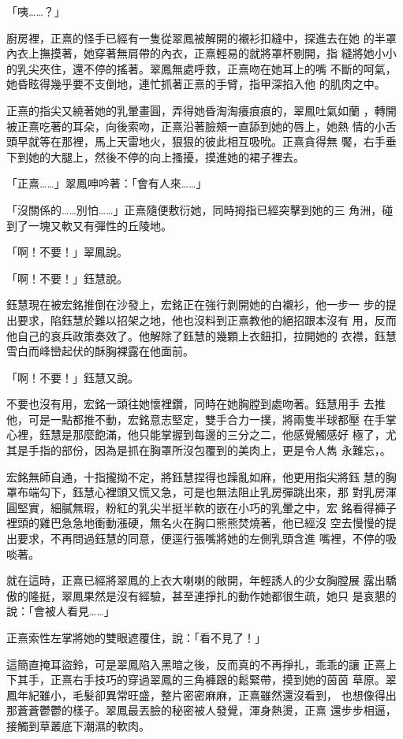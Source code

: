 「咦……？」

廚房裡，正熹的怪手已經有一隻從翠鳳被解開的襯衫扣縫中，探進去在她
的半罩內衣上撫摸著，她穿著無肩帶的內衣，正熹輕易的就將罩杯剔開，指
縫將她小小的乳尖夾住，還不停的搖著。翠鳳無處呼救，正熹吻在她耳上的嘴
不斷的呵氣，她昏眩得幾乎要不支倒地，連忙抓著正熹的手臂，指甲深掐入他
的肌肉之中。

正熹的指尖又繞著她的乳暈畫圓，弄得她昏淘淘癢痕痕的，翠鳳吐氣如蘭
，轉開被正熹吃著的耳朵，向後索吻，正熹沿著臉頰一直舔到她的唇上，她熱
情的小舌頭早就等在那裡，馬上天雷地火，狠狠的彼此相互吸吮。正熹貪得無
饜，右手垂下到她的大腿上，然後不停的向上搔擾，摸進她的裙子裡去。

「正熹……」翠鳳呻吟著：「會有人來……」

「沒關係的……別怕……」正熹隨便敷衍她，同時拇指已經突擊到她的三
角洲，碰到了一塊又軟又有彈性的丘陵地。

「啊！不要！」翠鳳說。

「啊！不要！」鈺慧說。

鈺慧現在被宏銘推倒在沙發上，宏銘正在強行剝開她的白襯衫，他一步一
步的提出要求，陷鈺慧於難以招架之地，他也沒料到正熹教他的絕招跟本沒有
用，反而他自己的哀兵政策奏效了。他解除了鈺慧的幾顆上衣鈕扣，拉開她的
衣襟，鈺慧雪白而峰巒起伏的酥胸裸露在他面前。

「啊！不要！」鈺慧又說。

不要也沒有用，宏銘一頭往她懷裡鑽，同時在她胸膛到處吻著。鈺慧用手
去推他，可是一點都推不動，宏銘意志堅定，雙手合力一撲，將兩隻半球都壓
在手掌心裡，鈺慧是那麼飽滿，他只能掌握到每邊的三分之二，他感覺觸感好
極了，尤其是手指的部份，因為是抓在胸罩所沒包覆到的美肉上，更是令人雋
永難忘，。

宏銘無師自通，十指攏拗不定，將鈺慧捏得也躁亂如麻，他更用指尖將鈺
慧的胸罩布端勾下，鈺慧心裡頭又慌又急，可是也無法阻止乳房彈跳出來，那
對乳房渾圓堅實，細膩無瑕，粉紅的乳尖半挺半軟的嵌在小巧的乳暈之中，宏
銘看得褲子裡頭的雞巴急急地衝動漲硬，無名火在胸口熊熊焚燒著，他已經沒
空去慢慢的提出要求，不再問過鈺慧的同意，便逕行張嘴將她的左側乳頭含進
嘴裡，不停的吸啖著。

就在這時，正熹已經將翠鳳的上衣大喇喇的敞開，年輕誘人的少女胸膛展
露出驕傲的隆挺，翠鳳果然是沒有經驗，甚至連掙扎的動作她都很生疏，她只
是哀懇的說：「會被人看見……」

正熹索性左掌將她的雙眼遮覆住，說：「看不見了！」

這簡直掩耳盜鈴，可是翠鳳陷入黑暗之後，反而真的不再掙扎，乖乖的讓
正熹上下其手，正熹右手技巧的穿過翠鳳的三角褲跟的鬆緊帶，摸到她的茵茵
草原。翠鳳年紀雖小，毛髮卻異常旺盛，整片密密麻麻，正熹雖然還沒看到，
也想像得出那蒼蒼鬱鬱的樣子。翠鳳最丟臉的秘密被人發覺，渾身熱燙，正熹
還步步相逼，接觸到草叢底下潮濕的軟肉。

